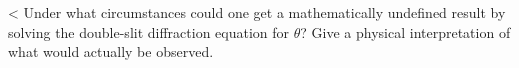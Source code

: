 <%
Under what circumstances could one get a mathematically
undefined result by solving the double-slit diffraction
equation for $\theta $? Give a physical interpretation of
what would actually be observed.
